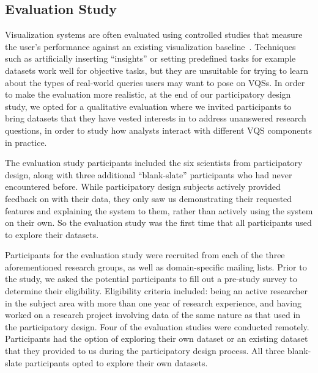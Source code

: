 \subsection{Evaluation Study}
\par Visualization systems are often evaluated using controlled studies that measure the user's performance against an existing visualization baseline~\cite{Plaisant2004}. Techniques such as artificially inserting ``insights'' or setting predefined tasks for example datasets work well for objective tasks,  but they are unsuitable for trying to learn about the types of real-world queries users may want to pose on VQSs. %
In order to make the evaluation more realistic, at the end of our participatory design study, we opted for a qualitative evaluation where we invited participants to bring datasets that they have vested interests in to address unanswered research questions, in order to study how analysts interact with different VQS components in practice.
\par The evaluation study participants included the six scientists from participatory design, along with three additional ``blank-slate'' participants who had never encountered \zv before. While participatory design subjects actively provided feedback on \zv with their data, they only saw us demonstrating their requested features and explaining the system to them, rather than actively using the system on their own. So the evaluation study was the first time that all participants used \zv to explore their datasets.
\par Participants for the evaluation study were recruited from each of the three aforementioned research groups, as well as domain-specific mailing lists. Prior to the study, we asked the potential participants to fill out a pre-study survey to determine their eligibility. Eligibility criteria included: being an active researcher in the subject area with more than one year of research experience, and having worked on a research project involving data of the same nature as that used in the participatory design. Four of the evaluation studies were conducted remotely. Participants had the option of exploring their own dataset or an existing dataset that they provided to us during the participatory design process. All three blank-slate participants opted to explore their own datasets. %
